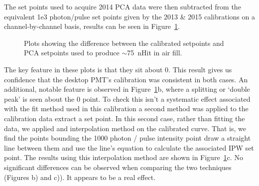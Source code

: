 \documentclass[12pt]{report}
\begin{document}
The set points used to acquire 2014 PCA data were then subtracted from the equivalent 1e3 photon/pulse set points given by the 2013 \& 2015 calibrations on a channel-by-channel basis, results can be seen in Figure~\ref{fig:CalibMinusData}. 

\begin{figure}[htp]
	\centering
	\newline
	\caption{Plots showing the difference between the calibrated setpoints and PCA setpoints used to produce $\sim$75~nHit in air fill.}
	\label{fig:CalibMinusData} 
\end{figure}

The key feature in these plots is that they sit about 0. This result gives us confidence that the desktop PMT's calibration was consistent in both cases. An additional, notable feature is observed in Figure~\ref{fig:CalibMinusData}b, where a splitting or `double peak' is seen about the 0 point. To check this isn't a systematic effect associated with the fit method used in this calibration a second method was applied to the calibration data extract a set point. In this second case, rather than fitting the data, we applied and interpolation method on the calibrated curve. That is, we find the points bounding the 1000 photon / pulse intensity point draw a straight line between them and use the line's equation to calculate the associated IPW set point. The results using this interpolation method are shown in Figure~\ref{fig:CalibMinusData}c. No significant differences can be observed when comparing the two techniques (Figures b) and c)). It appears to be a real effect. 
\end{document}
